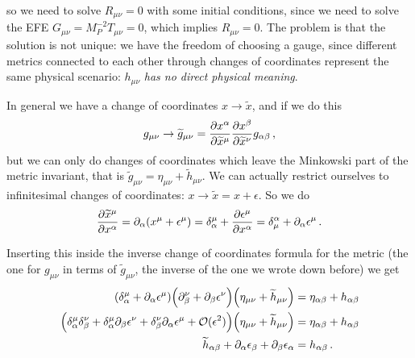 \documentclass[main.tex]{subfiles}
\begin{document}
%
so we need to solve \(R_{\mu \nu }  =0 \) with some initial conditions, since we need to solve the EFE \(G_{\mu \nu } = M_P^{-2} T_{\mu \nu } = 0\), which implies \(R_{\mu \nu }= 0 \). 
The problem is that the solution is not unique: we have the freedom of choosing a gauge, since different metrics connected to each other through changes of coordinates represent the same physical scenario: \(h_{\mu \nu } \) \emph{has no direct physical meaning}. 

In general we have a change of coordinates \(x \to \widetilde{x}\), and if we do this 
%
\begin{align}
g_{\mu \nu } \to \widetilde{g}_{\mu \nu } = \pdv{x^{\alpha }}{\widetilde{x}^{\mu  }} \pdv{x^{\beta }}{\widetilde{x}^{\nu }} g_{\alpha \beta }
\,,
\end{align}
%
but we can only do changes of coordinates which leave the Minkowski part of the metric invariant, that is \(\widetilde{g}_{\mu \nu } = \eta_{\mu \nu } + \widetilde{h}_{\mu \nu }\). We can actually restrict ourselves to infinitesimal changes of coordinates: \(x \to \widetilde{x} = x + \epsilon \). So we do 
%
\begin{align}
\pdv{\widetilde{x}^{\mu }}{x^{\alpha }} = \partial_{\alpha } \qty( x^{ \mu } + \epsilon^{\mu })
= \delta_{\alpha }^{\mu } + \pdv{\epsilon^{\mu }}{x^{\alpha }} = \delta_{\mu }^{\alpha } + \partial_{\alpha } \epsilon^{\mu }
\,.
\end{align}

Inserting this inside the inverse change of coordinates formula for the metric (the one for \(g_{\mu \nu }\) in terms of \(\widetilde{g}_{\mu \nu }\), the inverse of the one we wrote down before) we get 
%
\begin{align}
\qty(\delta^{\mu}_{\alpha } + \partial_{\alpha } \epsilon^{\mu }) \qty(\partial^{\nu }_{\beta } + \partial_{\beta } \epsilon^{\nu }) \qty(\eta_{\mu \nu } + \widetilde{h}_{\mu \nu }) &= \eta_{\alpha \beta } +h_{\alpha \beta }  \\
\qty(\delta^{\mu }_{\alpha } \delta^{\nu }_{\beta } + \delta^{\mu }_{\alpha } \partial_{\beta } \epsilon^{\nu } 
+ \delta^{\nu  }_{\beta  } \partial_{\alpha  } \epsilon^{\mu  } + \mathcal{O} (\epsilon^2))  \qty(\eta_{\mu \nu } + \widetilde{h}_{\mu \nu }) &= \eta_{\alpha \beta }  + h_{\alpha \beta }  \\
\widetilde{h}_{\alpha \beta }+
\partial_{\alpha } \epsilon_{\beta } + \partial_{\beta } \epsilon_{\alpha } &= h_{\alpha \beta } 
\,.
\end{align}
\end{document}
